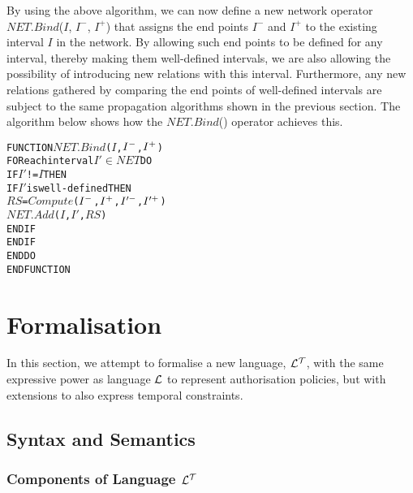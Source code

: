 \documentclass[11pt]{report}
\newenvironment{vverbatim}
{
  \begin{alltt}
}
{
  \vspace{-\baselineskip}
  \end{alltt}
}
\begin{document}
        By using the above algorithm, we can now define a new network operator
        $NET.Bind$($I$, $I^-$, $I^+$) that assigns the end points $I^-$ and
        $I^+$ to the existing interval $I$ in the network. By allowing such
        end points to be defined for any interval, thereby making them
        well-defined intervals, we are also allowing the possibility of
        introducing new relations with this interval. Furthermore, any new
        relations gathered by comparing the end points of well-defined
        intervals are subject to the same propagation algorithms shown in the
        previous section. The algorithm below shows how the $NET.Bind$()
        operator achieves this.

        \begin{vverbatim}
  FUNCTION \(NET.Bind\)(\(I\), \(I\sp{-}\), \(I\sp{+}\))
    FOR each interval \(I'\) \(\in\) \(NET\) DO
      IF \(I'\) != \(I\) THEN
        IF \(I'\) is well-defined THEN
          \(RS\) = \(Compute\)(\(I\sp{-}\), \(I\sp{+}\), \(I'\sp{-}\), \(I'\sp{+}\))
          \(NET.Add\)(\(I\), \(I'\), \(RS\))
        ENDIF
      ENDIF
    ENDDO
  ENDFUNCTION
        \end{vverbatim}

    \section{Formalisation}

      In this section, we attempt to formalise a new language, ${\cal L^T}$,
      with the same expressive power as language ${\cal L}$ to represent
      authorisation policies, but with extensions to also express temporal
      constraints.

      \subsection{Syntax and Semantics}

        \subsubsection{Components of Language ${\cal L^T}$}
\end{document}
